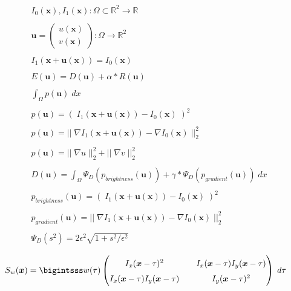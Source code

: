 \documentclass[11pt]{article}
\newcommand{\mat}[1]{\begin{pmatrix} #1 \end{pmatrix}}
\newcommand{\Mat}[1]{\begingroup
\renewcommand*{\arraystretch}{1.5}
\mat{#1}
\endgroup}
\newcommand{\Real}{\mathbb{R}}
\newcommand{\flow}{\boldsymbol{u}}
\newcommand{\x}{\boldsymbol{x}}
\begin{document}
\begin{align*}
& I_0(\x),I_1(\x) : \Omega \subset \Real^2 \rightarrow \Real
\\\\
& \flow = \mat{u(\x)\\v(\x)} : \Omega \rightarrow \Real^2
\\\\
&I_1(\x+\flow(\x))=I_0(\x)
\\\\
&E(\flow)=D(\flow)+\alpha*R(\flow)
\\\\
&\int_\Omega p(\flow)\;dx
\\\\
&p(\flow) = (\;I_1(\x+\flow(\x))-I_0(\x)\;)^2
\\\\
&p(\flow) = ||\;\nabla I_1(\x+\flow(\x))-\nabla I_0(\x)\;||_2^2
\\\\
&p(\flow)= ||\;\nabla u\;||_2^2 + ||\;\nabla v\;||_2^2
\\\\
&D(\flow) = \int_\Omega \Psi_D(p_{brightness}(\flow)) + \gamma*\Psi_D(p_{gradient}(\flow))\;dx
\\\\
&p_{brightness}(\flow) = (\;I_1(\x+\flow(\x))-I_0(\x)\;)^2
\\\\
&p_{gradient}(\flow) = ||\;\nabla I_1(\x+\flow(\x))-\nabla I_0(\x)\;||_2^2
\\\\
&\Psi_D(s^2) = 2\epsilon^2\sqrt{1+s^2/\epsilon^2}
\end{align*}

\begin{align*}
S_w(\x) = \bigintsss w(\tau)\Mat{I_x(\x-\tau)^2 && I_x(\x-\tau)I_y(\x-\tau)\\I_x(\x-\tau)I_y(\x-\tau) && I_y(\x-\tau)^2} \;d\tau
\end{align*}
\end{document}
